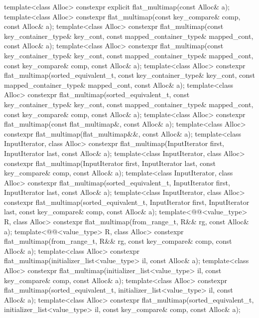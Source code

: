 \begin{codeblock}
{{    template<class Alloc>
      constexpr explicit flat_multimap(const Alloc& a);
    template<class Alloc>
      constexpr flat_multimap(const key_compare& comp, const Alloc& a);
    template<class Alloc>
      constexpr flat_multimap(const key_container_type& key_cont,
                              const mapped_container_type& mapped_cont, const Alloc& a);
    template<class Alloc>
      constexpr flat_multimap(const key_container_type& key_cont,
                              const mapped_container_type& mapped_cont,
                              const key_compare& comp, const Alloc& a);
    template<class Alloc>
      constexpr flat_multimap(sorted_equivalent_t, const key_container_type& key_cont,
                              const mapped_container_type& mapped_cont, const Alloc& a);
    template<class Alloc>
      constexpr flat_multimap(sorted_equivalent_t, const key_container_type& key_cont,
                              const mapped_container_type& mapped_cont,
                              const key_compare& comp, const Alloc& a);
    template<class Alloc>
      constexpr flat_multimap(const flat_multimap&, const Alloc& a);
    template<class Alloc>
      constexpr flat_multimap(flat_multimap&&, const Alloc& a);
    template<class InputIterator, class Alloc>
      constexpr flat_multimap(InputIterator first, InputIterator last, const Alloc& a);
    template<class InputIterator, class Alloc>
      constexpr flat_multimap(InputIterator first, InputIterator last,
                              const key_compare& comp, const Alloc& a);
    template<class InputIterator, class Alloc>
      constexpr flat_multimap(sorted_equivalent_t, InputIterator first, InputIterator last,
                              const Alloc& a);
    template<class InputIterator, class Alloc>
      constexpr flat_multimap(sorted_equivalent_t, InputIterator first, InputIterator last,
                              const key_compare& comp, const Alloc& a);
    template<@@<value_type> R, class Alloc>
      constexpr flat_multimap(from_range_t, R&& rg, const Alloc& a);
    template<@@<value_type> R, class Alloc>
      constexpr flat_multimap(from_range_t, R&& rg, const key_compare& comp, const Alloc& a);
    template<class Alloc>
      constexpr flat_multimap(initializer_list<value_type> il, const Alloc& a);
    template<class Alloc>
      constexpr flat_multimap(initializer_list<value_type> il, const key_compare& comp,
                              const Alloc& a);
    template<class Alloc>
      constexpr flat_multimap(sorted_equivalent_t, initializer_list<value_type> il,
                              const Alloc& a);
    template<class Alloc>
      constexpr flat_multimap(sorted_equivalent_t, initializer_list<value_type> il,
                              const key_compare& comp, const Alloc& a);

}}
\end{codeblock}
